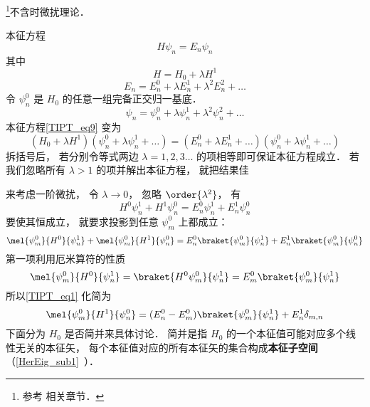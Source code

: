 
\begin{issues}
\issueDraft
{}
\end{issues}


\footnote{参考 \cite{GriffQ} \cite{Shankar} \cite{Sakurai} \cite{Merzbacher} 相关章节．}不含时微扰理论．

本征方程
\begin{equation}\label{TIPT_eq9}
H \psi_n = E_n \psi_n
\end{equation}
其中
\begin{equation}\label{TIPT_eq3}
H = H_0 + \lambda H^1
\end{equation}
\begin{equation}
E_n = E_n^0 + \lambda E_n^1 + \lambda^2 E_n^2 + \dots
\end{equation}
令 $\psi_n^0$ 是 $H_0$ 的任意一组完备正交归一基底．
\begin{equation}
\psi_n = \psi_n^0 + \lambda\psi_n^1 + \lambda^2 \psi_n^2 + \dots
\end{equation}
本征方程\autoref{TIPT_eq9} 变为
\begin{equation}
(H_0 + \lambda H^1)(\psi_n^0 + \lambda\psi_n^1 + \dots) = (E_n^0 + \lambda E_n^1 + \dots)(\psi_n^0 + \lambda\psi_n^1 + \dots)
\end{equation}
拆括号后， 若分别令等式两边 $\lambda = 1,2,3\dots$ 的项相等即可保证本征方程成立． 若我们忽略所有 $\lambda > 1$ 的项并解出本征方程， 就把结果佳

来考虑一阶微扰， 令 $\lambda \to 0$， 忽略 $\order{\lambda^2}$， 有
\begin{equation}
H^0\psi_n^1 + H^1 \psi_n^0 = E_n^0 \psi_n^1 + E_n^1 \psi_n^0
\end{equation}
要使其恒成立， 就要求投影到任意 $\psi_m^0$ 上都成立：
\begin{equation}\label{TIPT_eq1}
\mel{\psi_m^0}{H^0}{\psi_n^1} + \mel{\psi_m^0}{H^1}{\psi_n^0} = E_n^0 \braket{\psi_m^0}{\psi_n^1} + E_n^1 \braket{\psi_m^0}{\psi_n^0}
\end{equation}
第一项利用厄米算符的性质
\begin{equation}
\mel{\psi_m^0}{H^0}{\psi_n^1} = \braket{H^0\psi_m^0}{\psi_n^1} = E_m^0\braket{\psi_m^0}{\psi_n^1}
\end{equation}
所以\autoref{TIPT_eq1} 化简为
\begin{equation}\label{TIPT_eq2}
\mel{\psi_m^0}{H^1}{\psi_n^0} = (E_n^0 - E_m^0) \braket{\psi_m^0}{\psi_n^1} + E_n^1 \delta_{m,n}
\end{equation}
下面分为 $H_0$ 是否简并来具体讨论． 简并是指 $H_0$ 的一个本征值可能对应多个线性无关的本征矢， 每个本征值对应的所有本征矢的集合构成\textbf{本征子空间}（\autoref{HerEig_sub1}~）．


